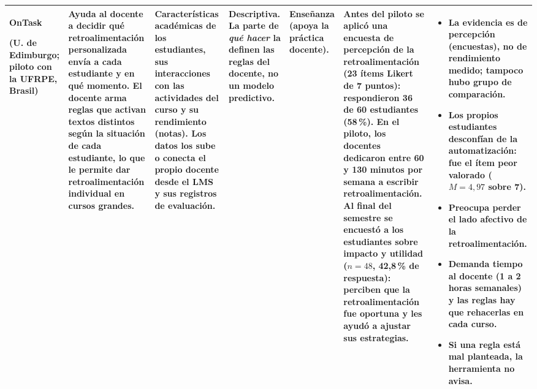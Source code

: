 \documentclass[10pt]{article}
\begin{document}
{\begin{longtable}{P{2.2cm} P{3.4cm} P{3.6cm} P{2.7cm} P{2.2cm} P{4.3cm} P{5.0cm}}
\textbf{OnTask}\par (U. de Edimburgo; piloto con la UFRPE, Brasil)
& Ayuda al \textbf{docente} a decidir qué retroalimentación personalizada envía a cada estudiante y en qué momento. El docente arma reglas que activan textos distintos según la situación de cada estudiante, lo que le permite dar retroalimentación individual en cursos grandes.
& Características académicas de los estudiantes, sus interacciones con las actividades del curso y su rendimiento (notas). Los datos los sube o conecta el propio docente desde el LMS y sus registros de evaluación.
& Descriptiva. La parte de \emph{qué hacer} la definen las reglas del docente, no un modelo predictivo.
& Enseñanza (apoya la práctica docente).
& Antes del piloto se aplicó una encuesta de percepción de la retroalimentación (23 ítems Likert de 7 puntos): respondieron 36 de 60 estudiantes (58\,\%). En el piloto, los docentes dedicaron entre 60 y 130 minutos por semana a escribir retroalimentación. Al final del semestre se encuestó a los estudiantes sobre impacto y utilidad ($n=48$, 42,8\,\% de respuesta): perciben que la retroalimentación fue oportuna y les ayudó a ajustar sus estrategias.
& \begin{itemize}
\item La evidencia es de percepción (encuestas), no de rendimiento medido; tampoco hubo grupo de comparación.
\item Los propios estudiantes desconfían de la automatización: fue el ítem peor valorado ($M=4{,}97$ sobre 7).
\item Preocupa perder el lado afectivo de la retroalimentación.
\item Demanda tiempo al docente (1 a 2 horas semanales) y las reglas hay que rehacerlas en cada curso.
\item Si una regla está mal planteada, la herramienta no avisa.
\end{itemize}\\
\midrule


\end{longtable}}
\end{document}
